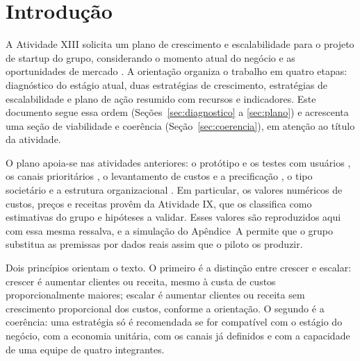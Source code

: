 \section{Introdução}
\label{sec:introducao}

A Atividade XIII solicita um plano de crescimento e escalabilidade para o projeto de startup do grupo, considerando o momento atual do negócio e as oportunidades de mercado \cite{pucminas2026xiii}. A orientação organiza o trabalho em quatro etapas: diagnóstico do estágio atual, duas estratégias de crescimento, estratégias de escalabilidade e plano de ação resumido com recursos e indicadores. Este documento segue essa ordem (Seções~\ref{sec:diagnostico} a \ref{sec:plano}) e acrescenta uma seção de viabilidade e coerência (Seção~\ref{sec:coerencia}), em atenção ao título da atividade.

O plano apoia-se nas atividades anteriores: o protótipo e os testes com usuários \cite{grupo2026a6}, os canais prioritários \cite{grupo2026a8}, o levantamento de custos e a precificação \cite{grupo2026a9}, o tipo societário \cite{grupo2026a10} e a estrutura organizacional \cite{grupo2026a11}. Em particular, os valores numéricos de custos, preços e receitas provêm da Atividade IX, que os classifica como estimativas do grupo e hipóteses a validar. Esses valores são reproduzidos aqui com essa mesma ressalva, e a simulação do Apêndice~A permite que o grupo substitua as premissas por dados reais assim que o piloto os produzir.

Dois princípios orientam o texto. O primeiro é a distinção entre crescer e escalar: crescer é aumentar clientes ou receita, mesmo à custa de custos proporcionalmente maiores; escalar é aumentar clientes ou receita sem crescimento proporcional dos custos, conforme a orientação. O segundo é a coerência: uma estratégia só é recomendada se for compatível com o estágio do negócio, com a economia unitária, com os canais já definidos e com a capacidade de uma equipe de quatro integrantes.
